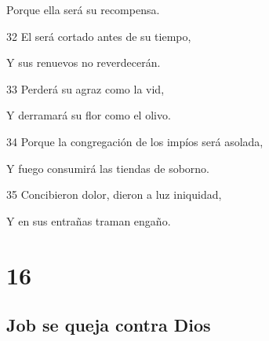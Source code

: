 \par Porque ella será su recompensa.
\par 32 El será cortado antes de su tiempo,
\par Y sus renuevos no reverdecerán.
\par 33 Perderá su agraz como la vid,
\par Y derramará su flor como el olivo.
\par 34 Porque la congregación de los impíos será asolada,
\par Y fuego consumirá las tiendas de soborno.
\par 35 Concibieron dolor, dieron a luz iniquidad,
\par Y en sus entrañas traman engaño.

\chapter{16}

\section*{Job se queja contra Dios}

